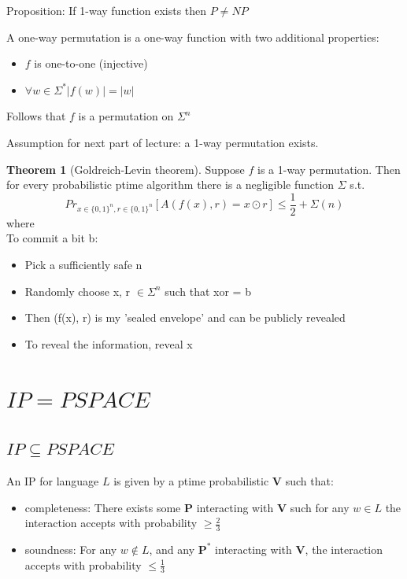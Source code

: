 \documentclass[a4paper,12pt]{article}
\theoremstyle{definition}
\newtheorem{theorem}[counter]{Theorem}
\theoremstyle{remark}
\begin{document}
Proposition: If 1-way function exists then $P \neq NP$

A one-way permutation is a one-way function with two additional properties:
\begin{itemize}
    \item $f$ is one-to-one (injective)
    \item $\forall w \in \Sigma^* |f(w)| = |w|$
\end{itemize}

Follows that $f$ is a permutation on $\Sigma^n$ %

Assumption for next part of lecture: a 1-way permutation exists.

\begin{theorem}[Goldreich-Levin theorem]
    Suppose $f$ is a 1-way permutation. Then for every probabilistic ptime algorithm there is a negligible function 
    $\Sigma$ s.t.
    \begin{equation*}
        Pr_{x \in \{0, 1\}^n, r \in \{0, 1\}^n} [A(f(x), r) = x \odot r] \leq \frac{1}{2} + \Sigma(n)
    \end{equation*}
    where
    \begin{equation*}
        [x \odot r = \sum_{i=1}^{n} x_i r_i mod 2]
    \end{equation*}
    To commit a bit b:
    \begin{itemize}
        \item Pick a sufficiently safe n
        \item Randomly choose x, r $\in \Sigma^n$ such that xor = b
        \item Then (f(x), r) is my 'sealed envelope' and can be publicly revealed
        \item To reveal the information, reveal x
    \end{itemize}
\end{theorem}







\newpage
\section{$IP = PSPACE$}
\subsection{$IP \subseteq PSPACE$}
An IP for language $L$ is given by a ptime probabilistic \textbf{V} such that:
\begin{itemize}
    \item completeness: There exists some \textbf{P} interacting with \textbf{V} such for any $w \in L$ the interaction accepts with probability $\geq \frac{2}{3}$
    \item soundness: For any $w \notin L$, and any $\textbf{P}^*$ interacting with \textbf{V}, the interaction accepts with probability $\leq \frac{1}{3}$  
\end{itemize}
\end{document}
